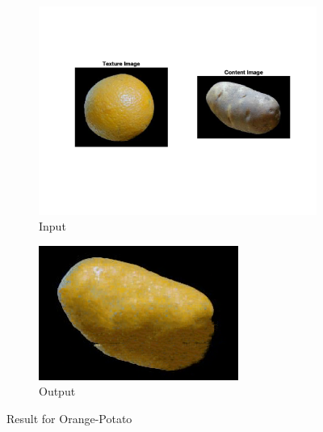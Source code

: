 \documentclass[10pt,twocolumn,letterpaper]{article}
\begin{document}
\begin{figure}[h]
    \centering
    \begin{subfigure}[h]{0.45\textwidth}
        \centering
        \includegraphics[trim={2cm 4cm 2cm 3cm}, clip, scale=0.5]{../results/bsize/inp_orange_potato.png}
        \caption{Input}
    \end{subfigure}
    \hfill
    \begin{subfigure}[h]{0.5\textwidth}
       \centering
       \includegraphics[scale=0.4]{../results/bsize/out_orange_potato_B_10_bdr_0_700000.png}
       \caption{Output}
   \end{subfigure}
   \caption{Result for Orange-Potato}
   \label{fig:ap_bs}
\end{figure}


\end{document}
